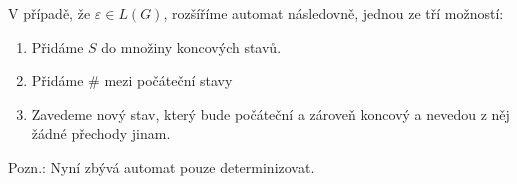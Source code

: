 \documentclass[10pt, a4paper, titlepage]{article}
\theoremstyle{note}
\begin{document}
V případě, že $\varepsilon \in L(G)$, rozšíříme automat následovně, jednou ze tří možností:
\begin{enumerate}
\item
Přidáme $S$ do množiny koncových stavů.
\item
Přidáme $\#$ mezi počáteční stavy
\item
Zavedeme nový stav, který bude počáteční a zároveň koncový a nevedou z něj žádné přechody jinam.
\end{enumerate}

Pozn.: Nyní zbývá automat pouze determinizovat.

\renewcommand{\indexcolumns}{3}
\printindex
\end{document}
